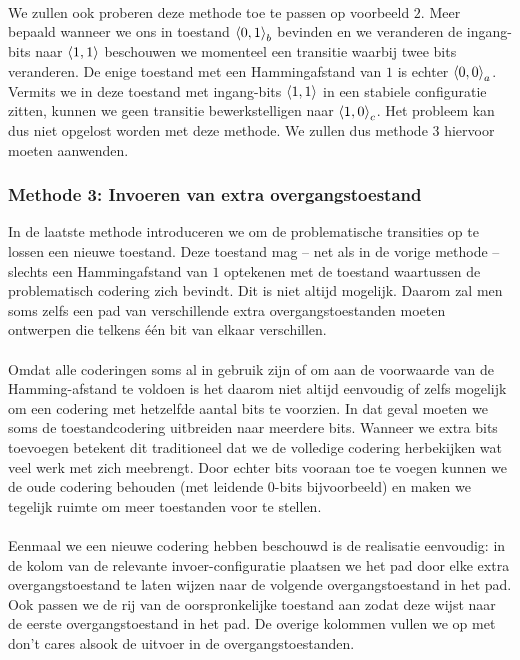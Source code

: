 \paragraph{}
We zullen ook proberen deze methode toe te passen op voorbeeld $2$. Meer bepaald wanneer we ons in toestand $\left\langle 0,1 \right\rangle_b$ bevinden en we veranderen de ingang-bits naar $\left\langle 1,1 \right\rangle$ beschouwen we momenteel een transitie waarbij twee bits veranderen. De enige toestand met een Hammingafstand van $1$ is echter $\left\langle 0,0 \right\rangle_a$. Vermits we in deze toestand met ingang-bits $\left\langle 1,1 \right\rangle$ in een stabiele configuratie zitten, kunnen we geen transitie bewerkstelligen naar $\left\langle 1,0 \right\rangle_c$. Het probleem kan dus niet opgelost worden met deze methode. We zullen dus methode $3$ hiervoor moeten aanwenden.
\subsubsection{Methode 3: Invoeren van extra overgangstoestand}
In de laatste methode introduceren we om de problematische transities op te lossen een nieuwe toestand. Deze toestand mag -- net als in de vorige methode -- slechts een Hammingafstand van $1$ optekenen met de toestand waartussen de problematisch codering zich bevindt. Dit is niet altijd mogelijk. Daarom zal men soms zelfs een pad van verschillende extra overgangstoestanden moeten ontwerpen die telkens \'e\'en bit van elkaar verschillen.
\paragraph{}
Omdat alle coderingen soms al in gebruik zijn of om aan de voorwaarde van de Hamming-afstand te voldoen is het daarom niet altijd eenvoudig of zelfs mogelijk om een codering met hetzelfde aantal bits te voorzien. In dat geval moeten we soms de toestandcodering uitbreiden naar meerdere bits. Wanneer we extra bits toevoegen betekent dit traditioneel dat we de volledige codering herbekijken wat veel werk met zich meebrengt. Door echter bits vooraan toe te voegen kunnen we de oude codering behouden (met leidende $0$-bits bijvoorbeeld) en maken we tegelijk ruimte om meer toestanden voor te stellen.
\paragraph{}
Eenmaal we een nieuwe codering hebben beschouwd is de realisatie eenvoudig: in de kolom van de relevante invoer-configuratie plaatsen we het pad door elke extra overgangstoestand te laten wijzen naar de volgende overgangstoestand in het pad. Ook passen we de rij van de oorspronkelijke toestand aan zodat deze wijst naar de eerste overgangstoestand in het pad. De overige kolommen vullen we op met don't cares alsook de uitvoer in de overgangstoestanden.
